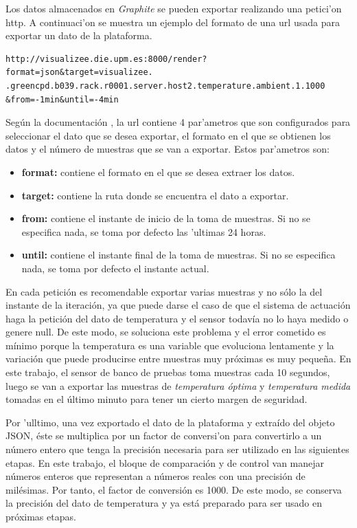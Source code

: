 	Los datos almacenados en \textit{Graphite} se pueden exportar realizando una petici'on http. A continuaci'on se muestra un ejemplo del formato de una url usada para exportar un dato de la plataforma.

\begin{verbatim}
http://visualizee.die.upm.es:8000/render?format=json&target=visualizee.
.greencpd.b039.rack.r0001.server.host2.temperature.ambient.1.1000
&from=-1min&until=-4min
\end{verbatim}

	 Según la documentación \cite{Graphite1}, la url contiene 4 par'ametros que son configurados para seleccionar el dato que se desea exportar, el formato en el que se obtienen los datos y el número de muestras que se van a exportar. Estos par'ametros son:

\begin{itemize}
\item \textbf{format:} contiene el formato en el que se desea extraer los datos.
\item \textbf{target:} contiene la ruta donde se encuentra el dato a exportar.
\item \textbf{from:} contiene el instante de inicio de la toma de muestras. Si no se especifica nada, se toma por defecto las 'ultimas 24 horas. 
\item \textbf{until:} contiene el instante final de la toma de muestras. Si no se especifica nada, se toma por defecto el instante actual.
\end{itemize}

	En cada petición es recomendable exportar varias muestras y no sólo la del instante de la iteración, ya que puede darse el caso de que el sistema de actuación haga la petición del dato de temperatura y el sensor todavía no lo haya medido o genere null. De este modo, se soluciona este problema y el error cometido es mínimo porque la temperatura es una variable que evoluciona lentamente y la variación que puede producirse entre muestras muy próximas es muy pequeña. En este trabajo, el sensor de banco de pruebas toma muestras cada 10 segundos, luego se van a exportar las muestras de \textit{temperatura óptima} y \textit{temperatura medida} tomadas en el último minuto para tener un cierto margen de seguridad.

	Por 'ulltimo, una vez exportado el dato de la plataforma y extraído del objeto JSON, éste se multiplica por un factor de conversi'on para convertirlo a un número entero que tenga la precisión necesaria para ser utilizado en las siguientes etapas. En este trabajo, el bloque de comparación y de control van manejar números enteros que representan a números reales con una precisión de milésimas. Por tanto, el factor de conversión es 1000. De este modo, se conserva la precisión del dato de temperatura y ya está preparado para ser usado en próximas etapas.

